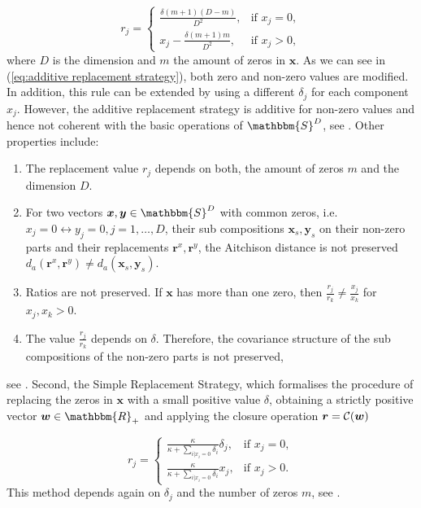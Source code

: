 \begin{equation}
r_j = 
\begin{cases}
\frac{\delta(m+1)(D-m)}{D^2}, & \text{if } x_j=0, \\
x_j - \frac{\delta(m+1)m}{D^2}, & \text{if } x_j>0,
\end{cases}
\label{eq:additive replacement strategy}
\end{equation}
%
where $D$ is the dimension and $m$ the amount of zeros in $\bm{x}$. 
As we can see in (\ref{eq:additive replacement strategy}), both zero and non-zero values are modified. In addition, this rule can be extended by using a different $\delta_j$ for each component $x_j$. However, the additive replacement strategy is additive for non-zero values and hence not coherent with the basic operations of $\mathbbm{S}^D$, see \textcite{Josep:2003}. Other properties include:

\begin{enumerate}
	\item The replacement value $r_j$ depends on both, the amount of zeros $m$ and the dimension $D$.
	\item For two vectors $\bm{x},\bm{y} \in \mathbbm{S}^D$ with common zeros, i.e. $x_j= 0 \leftrightarrow y_j=0, j=1,\ldots,D$, their sub compositions $\bm{x}_s,\bm{y}_s$  on their non-zero parts and their replacements $\bm{r}^x,\bm{r}^y$, the Aitchison distance is not preserved $d_a(\bm{r}^x,\bm{r}^y) \neq d_a(\bm{x}_s,\bm{y}_s)$. 
	\item Ratios are not preserved. If $\bm{x}$ has more than one zero, then $\frac{r_j}{r_k} \neq \frac{x_j}{x_k}$ for $x_j,x_k > 0$.
	\item The value $\frac{r_j}{r_k}$ depends on $\delta$. Therefore, the covariance structure of the sub compositions of the non-zero parts is not preserved, 
\end{enumerate}
see \textcite{Josep:2003}. 
Second, the Simple Replacement Strategy, which formalises the procedure of replacing the zeros in $\bm{x}$ with a small positive value $\delta$, obtaining a strictly positive vector $\bm{w} \in \mathbbm{R}_+$ and applying the closure operation $\bm{r}=\mathcal{C}(\bm{w})$

\begin{equation}
r_j = 
\begin{cases}
\frac{\kappa}{\kappa + \sum_{i| x_i=0}\delta_i } \delta_j, & \text{if } x_j=0, \\
\frac{\kappa}{\kappa + \sum_{i| x_i=0}\delta_i } x_j, & \text{if } x_j>0.
\end{cases}
\label{eq:simple replacement strategy}
\end{equation}
%
This method depends again on $\delta_j$ and the number of zeros $m$, see \textcite{Josep:2003}. 

